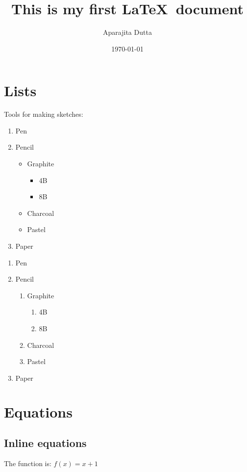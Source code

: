 \documentclass[12pt]{article}
\begin{document}
	\title{ This is my first \LaTeX \ document}
	\author{Aparajita Dutta}
	\date{\today}
	\maketitle
	\tableofcontents
	\newpage
\section{Lists}
	Tools for making sketches:
	
\begin{enumerate}
	\item Pen
	\item Pencil
	\begin{itemize}
		\item Graphite
		\begin{itemize}
			\item 4B
			\item 8B
		\end{itemize}
		\item Charcoal
		\item Pastel
	\end{itemize}
	\item Paper
\end{enumerate}

\begin{enumerate}
	\item Pen
	\item Pencil
	\begin{enumerate}
		\item Graphite
		\begin{enumerate}
			\item 4B
			\item 8B
		\end{enumerate}
		\item Charcoal
		\item Pastel
	\end{enumerate}
	\item Paper
\end{enumerate}

\section{Equations}
\subsection{Inline equations}
The function is: $f(x) = x+1$
\end{document}
